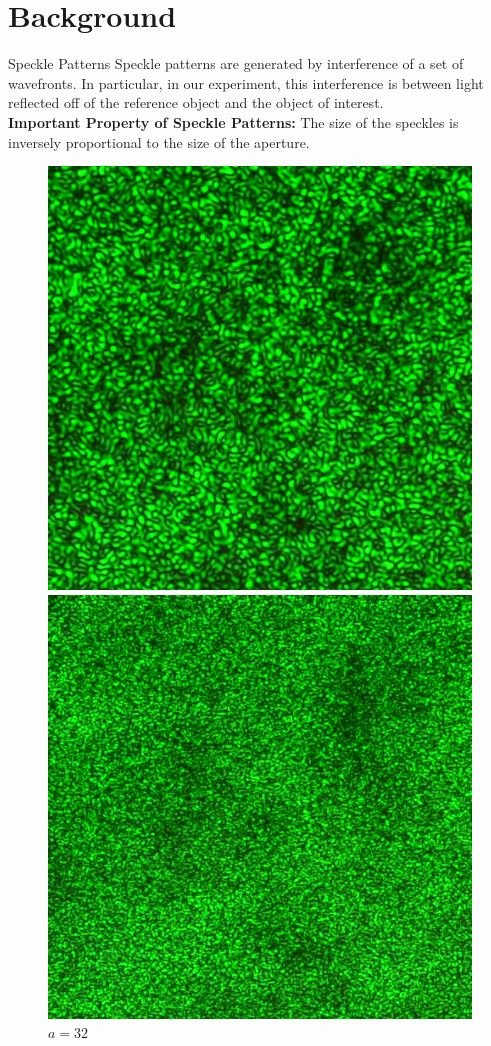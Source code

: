\documentclass[pdf]{beamer}
\begin{document}
\section{Background}
\begin{frame}{Speckle Patterns}
Speckle patterns are generated by interference of a set of wavefronts. In particular, in our experiment, this interference is between light reflected off of the reference object and the object of interest.\\
\vspace{0.3cm}
{\bf Important Property of Speckle Patterns:}
The size of the speckles is inversely proportional to the size of the aperture.
\begin{figure}[!htb]
  \includegraphics[width=\linewidth]{apertures/32.png}
  \caption{$a=32$}
\endminipage\hfill
{}
  \includegraphics[width=\linewidth]{apertures/16.png}

\end{figure}
\end{frame}
\end{document}
